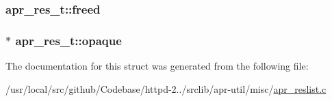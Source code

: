 \subsubsection[{\texorpdfstring{freed}{freed}}]{ apr\+\_\+res\+\_\+t\+::freed}\hypertarget{structapr__res__t_a366c15b84ded7493eba8eb0d47a90412}{}\label{structapr__res__t_a366c15b84ded7493eba8eb0d47a90412}
\subsubsection[{\texorpdfstring{opaque}{opaque}}]{$\ast$ apr\+\_\+res\+\_\+t\+::opaque}\hypertarget{structapr__res__t_a45f937d8bf156f3241fa44e6138bf1f4}{}\label{structapr__res__t_a45f937d8bf156f3241fa44e6138bf1f4}


The documentation for this struct was generated from the following file\+:\begin{DoxyCompactItemize}
\item 
/usr/local/src/github/\+Codebase/httpd-\/2../srclib/apr-\/util/misc/\hyperlink{apr__reslist_8c}{apr\+\_\+reslist.\+c}\end{DoxyCompactItemize}
